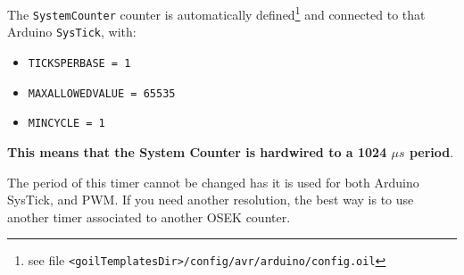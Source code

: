 The \texttt{SystemCounter} counter is automatically defined\footnote{see file \texttt{<goilTemplatesDir>/config/avr/arduino/config.oil}} and connected to that Arduino \texttt{SysTick}, with:
\begin{itemize}
\item \texttt{TICKSPERBASE = 1}
\item \texttt{MAXALLOWEDVALUE = 65535}
\item \texttt{MINCYCLE = 1}
\end{itemize}

\textbf{This means that the System Counter is hardwired to a 1024 $\mu s$ period}.

The period of this timer cannot be changed has it is used for both Arduino SysTick, and PWM. If you need another resolution, the best way is to use another timer associated to another OSEK counter.
